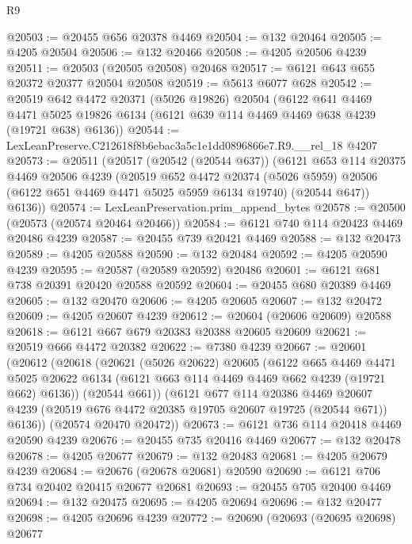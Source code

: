 \begin{lexlean}{R9}
\begin{coremodule}
@20503 := @20455 @656 @20378 @4469
@20504 := @132 @20464
@20505 := @4205 @20504
@20506 := @132 @20466
@20508 := @4205 @20506 @4239
@20511 := @20503 (@20505 @20508) @20468
@20517 := @6121 @643 @655 @20372 @20377 @20504 @20508
@20519 := @5613 @6077 @628
@20542 := @20519
    @642
    @4472
    @20371
    (@5026 @19826)
    @20504
    (@6122
      @641
      @4469
      @4471
      @5025
      @19826
      @6134
      (@6121 @639 @114 @4469 @4469 @638 @4239 (@19721 @638) @6136))
@20544 := LexLeanPreserve.C212618f8b6ebac3a5c1e1dd0896866e7.R9.__rel_18 @4207
@20573 := @20511
    (@20517
      (@20542 (@20544 @637))
      (@6121
        @653
        @114
        @20375
        @4469
        @20506
        @4239
        (@20519
          @652
          @4472
          @20374
          (@5026 @5959)
          @20506
          (@6122 @651 @4469 @4471 @5025 @5959 @6134 @19740)
          (@20544 @647))
        @6136))
@20574 := LexLeanPreservation.prim_append_bytes
@20578 := @20500 (@20573 (@20574 @20464 @20466))
@20584 := @6121 @740 @114 @20423 @4469 @20486 @4239
@20587 := @20455 @739 @20421 @4469
@20588 := @132 @20473
@20589 := @4205 @20588
@20590 := @132 @20484
@20592 := @4205 @20590 @4239
@20595 := @20587 (@20589 @20592) @20486
@20601 := @6121 @681 @738 @20391 @20420 @20588 @20592
@20604 := @20455 @680 @20389 @4469
@20605 := @132 @20470
@20606 := @4205 @20605
@20607 := @132 @20472
@20609 := @4205 @20607 @4239
@20612 := @20604 (@20606 @20609) @20588
@20618 := @6121 @667 @679 @20383 @20388 @20605 @20609
@20621 := @20519 @666 @4472 @20382
@20622 := @7380 @4239
@20667 := @20601
    (@20612
      (@20618
        (@20621
          (@5026 @20622)
          @20605
          (@6122
            @665
            @4469
            @4471
            @5025
            @20622
            @6134
            (@6121 @663 @114 @4469 @4469 @662 @4239 (@19721 @662) @6136))
          (@20544 @661))
        (@6121
          @677
          @114
          @20386
          @4469
          @20607
          @4239
          (@20519 @676 @4472 @20385 @19705 @20607 @19725 (@20544 @671))
          @6136))
      (@20574 @20470 @20472))
@20673 := @6121 @736 @114 @20418 @4469 @20590 @4239
@20676 := @20455 @735 @20416 @4469
@20677 := @132 @20478
@20678 := @4205 @20677
@20679 := @132 @20483
@20681 := @4205 @20679 @4239
@20684 := @20676 (@20678 @20681) @20590
@20690 := @6121 @706 @734 @20402 @20415 @20677 @20681
@20693 := @20455 @705 @20400 @4469
@20694 := @132 @20475
@20695 := @4205 @20694
@20696 := @132 @20477
@20698 := @4205 @20696 @4239
@20772 := @20690
    (@20693
      (@20695 @20698)
      @20677

\end{coremodule}
\end{lexlean}
